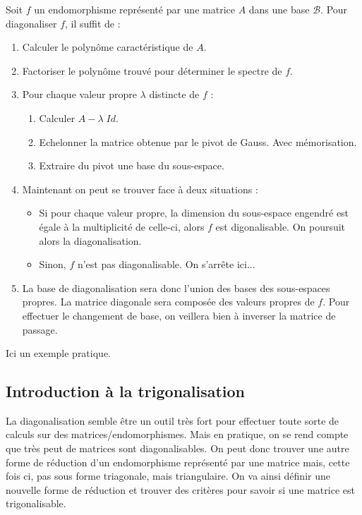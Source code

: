 Soit $f$ un endomorphisme représenté par une matrice $A$ dans une base $\mathcal{B}$. 
Pour diagonaliser $f$, il suffit de :
\begin{enumerate}
    \item Calculer le polynôme caractéristique de $A$. 
    \item Factoriser le polynôme trouvé pour déterminer le spectre de $f$. 
    \item Pour chaque valeur propre $\lambda$ distincte de $f$ :
        \begin{enumerate}
            \item Calculer $A - \lambda \; Id$. 
            \item Echelonner la matrice obtenue par le pivot de Gauss. Avec mémorisation. 
            \item Extraire du pivot une base du sous-espace. 
        \end{enumerate}
    \item Maintenant on peut se trouver face à deux situations :
        \begin{itemize}
            \item Si pour chaque valeur propre, la dimension du sous-espace engendré est égale à la multiplicité de 
                celle-ci, alors $f$ est digonalisable. On poursuit alors la diagonalisation. 
            \item Sinon, $f$ n'est pas diagonalisable. On s'arrête ici... 
        \end{itemize}
    \item La base de diagonalisation sera donc l'union des bases des sous-espaces propres. 
            La matrice diagonale sera composée des valeurs propres de $f$. 
            Pour effectuer le changement de base, on veillera bien à inverser la matrice de passage. 
\end{enumerate}

\begin{example}
    Ici un exemple pratique. 
\end{example}

\subsection{Introduction à la trigonalisation}

La diagonalisation semble être un outil très fort pour effectuer toute sorte de calculs sur des matrices/endomorphismes. 
Mais en pratique, on se rend compte que très peut de matrices sont diagonalisables. 
On peut donc trouver une autre forme de réduction d'un endomorphisme représenté par une matrice mais, cette fois ci, pas sous forme triagonale, 
mais triangulaire. On va ainsi définir une nouvelle forme de réduction et trouver des critères pour savoir si une matrice est trigonalisable. 

